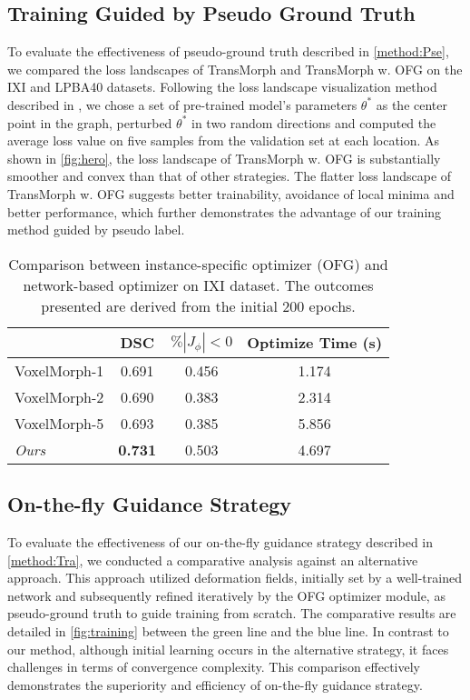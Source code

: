 \documentclass[10pt,twocolumn,letterpaper]{article}
\begin{document}
\subsection{Training Guided by Pseudo Ground Truth}
To evaluate the effectiveness of pseudo-ground truth described in \cref{method:Pse}, we compared the loss landscapes of TransMorph and TransMorph w. OFG on the IXI and LPBA40 datasets.
Following the loss landscape visualization method described in \cite{li2018visualizing, goodfellow2015qualitatively, im2017empirical}, we chose a set of pre-trained model's parameters $\theta^{\ast}$ as the center point in the graph, perturbed $\theta^{\ast}$ in two random directions 
and computed the average loss value on five samples from the validation set at each location. 
As shown in \cref{fig:hero}, the loss landscape of TransMorph w. OFG is substantially smoother and convex than that of other strategies. The flatter loss landscape of TransMorph w. OFG suggests better trainability, avoidance of local minima and better performance, which further demonstrates the advantage of our training method guided by pseudo label.

\begin{table}
\begin{center}
{\small{
    \begin{tabular}{lccc}
\toprule
     & DSC & $\% |J_{\phi}| < 0$ & Optimize Time (s) \\
    \midrule
    VoxelMorph-1 & 0.691 & 0.456 & 1.174 \\
    VoxelMorph-2 & 0.690 & 0.383 & 2.314 \\
    VoxelMorph-5 & 0.693 & 0.385 & 5.856 \\
    \midrule
    \textit{Ours} & \textbf{0.731} & 0.503 & 4.697 \\
    \bottomrule
    \end{tabular}
}}
\end{center}
\caption{Comparison between instance-specific optimizer (OFG) and network-based optimizer on IXI dataset\cite{ixi}. The outcomes presented are derived from the initial 200 epochs.}
\label{tab:ins}
\end{table}

\subsection{On-the-fly Guidance Strategy}
To evaluate the effectiveness of our on-the-fly guidance strategy described in \cref{method:Tra}, we conducted a comparative analysis against an alternative approach. This approach utilized deformation fields, initially set by a well-trained network and subsequently refined iteratively by the OFG optimizer module, as pseudo-ground truth to guide training from scratch. The comparative results are detailed in \cref{fig:training} between the green line and the blue line. In contrast to our method, although initial learning occurs in the alternative strategy, it faces challenges in terms of convergence complexity. This comparison effectively demonstrates the superiority and efficiency of on-the-fly guidance strategy.
\end{document}
